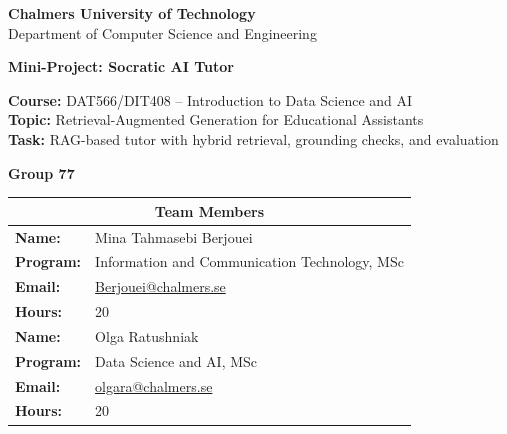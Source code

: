\documentclass[12pt,a4paper]{article}
\begin{document}
\begin{titlepage}
  \centering

  \vspace*{1cm}
  {\Large\textbf{Chalmers University of Technology}}\\
  {\large Department of Computer Science and Engineering}

  \vspace{2cm}

  {\Huge\bfseries\color{primary}
    Mini-Project: Socratic AI Tutor
  }

  \vspace{1.5cm}

  \begin{tcolorbox}[colback=blue!5, colframe=primary, width=0.8\textwidth, center]
    \centering
    {\large\textbf{Course:} DAT566/DIT408 -- Introduction to Data Science and AI}\\[4pt]
    {\textbf{Topic:} Retrieval-Augmented Generation for Educational Assistants}\\
    {\textbf{Task:} RAG-based tutor with hybrid retrieval, grounding checks, and evaluation}
  \end{tcolorbox}

  \vspace{1.5cm}

  \newcommand{\groupNumber}{77}
  \newcommand{\memberOneName}{Mina Tahmasebi Berjouei}
  \newcommand{\memberOneProgram}{Information and Communication Technology, MSc}
  \newcommand{\memberOneEmail}{\href{mailto:Berjouei@chalmers.se}{Berjouei@chalmers.se}}
  \newcommand{\memberOneHours}{20}

  \newcommand{\memberTwoName}{Olga Ratushniak}
  \newcommand{\memberTwoProgram}{Data Science and AI, MSc}
  \newcommand{\memberTwoEmail}{\href{mailto:olgara@chalmers.se}{olgara@chalmers.se}}
  \newcommand{\memberTwoHours}{20}

  {\Large\textbf{\color{secondary}Group \groupNumber}}

  \vspace{0.8cm}

  \begin{table}[h!]
    \centering
    \begin{tabular}{p{3cm}p{9cm}}
      \toprule
      \multicolumn{2}{c}{\textbf{Team Members}} \\
      \midrule
      \textbf{Name:}    & \memberOneName \\
      \textbf{Program:} & \memberOneProgram \\
      \textbf{Email:}   & \memberOneEmail \\
      \textbf{Hours:}   & \memberOneHours \\
      \midrule
      \textbf{Name:}    & \memberTwoName \\
      \textbf{Program:} & \memberTwoProgram \\
      \textbf{Email:}   & \memberTwoEmail \\
      \textbf{Hours:}   & \memberTwoHours \\
      \bottomrule
    \end{tabular}
  \end{table}


\end{titlepage}
\end{document}

